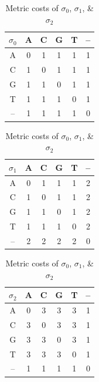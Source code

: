 \documentclass[11pt]{article}
\begin{document}
\begin{table}[!hbt]
\caption{Metric costs of $\sigma_0$, $\sigma_1$, \& $\sigma_2$}
\label{Tab:Metrics}
\begin{minipage}{0.3\textwidth}
	\centering
	\begin{tabular}{c|ccccc}
		$\sigma_0$ & A & C & G & T & -- \\ \hline
		A  & 0 & 1 & 1 & 1 & 1  \\
		C  & 1 & 0 & 1 & 1 & 1  \\
		G  & 1 & 1 & 0 & 1 & 1  \\
		T  & 1 & 1 & 1 & 0 & 1  \\
		-- & 1 & 1 & 1 & 1 & 0
	\end{tabular}
\end{minipage}
\hfill
\begin{minipage}{0.33\textwidth}
\centering
\begin{tabular}{c|ccccc}
$\sigma_1$ & A & C & G & T & -- \\ \hline
        A  & 0 & 1 & 1 & 1 & 2  \\
        C  & 1 & 0 & 1 & 1 & 2  \\
        G  & 1 & 1 & 0 & 1 & 2  \\
        T  & 1 & 1 & 1 & 0 & 2  \\
        -- & 2 & 2 & 2 & 2 & 0
\end{tabular}
\end{minipage}
\hfill
\begin{minipage}{0.3\textwidth}
\centering
\begin{tabular}{c|ccccc}
$\sigma_2$ & A & C & G & T & -- \\ \hline
        A  & 0 & 3 & 3 & 3 & 1  \\
        C  & 3 & 0 & 3 & 3 & 1  \\
        G  & 3 & 3 & 0 & 3 & 1  \\
        T  & 3 & 3 & 3 & 0 & 1  \\
        -- & 1 & 1 & 1 & 1 & 0
\end{tabular}
\end{minipage}
\end{table}
\end{document}
